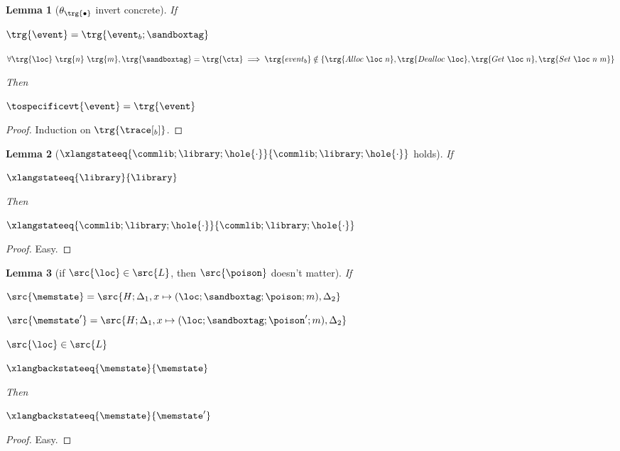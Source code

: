 \documentclass[a4paper,names,dvipsnames]{article}
\newtheorem{lemma}{Lemma}
\begin{document}
\begin{lemma}[$\theta_{\trg{\bullet}}$ invert concrete]\label{lem:trgfilter:invert:concrete}
  If
  \begin{goals}
    \item $\trg{\event}=\trg{\event_{b};\sandboxtag}$
    \item $\forall\trg{\loc}\ \trg{n}\ \trg{m},\trg{\sandboxtag}=\trg{\ctx}\implies\trg{event_{b}}\notin\{\trg{Alloc\ \loc\ n},\trg{Dealloc\ \loc},\trg{Get\ \loc\ n},\trg{Set\ \loc\ n\ m}\}$
  \end{goals}
  Then
  \begin{assumptions}
    \item $\tospecificevt{\event}=\trg{\event}$
  \end{assumptions}
\end{lemma}
\begin{proof}
  Induction on $\trg{\trace[_{b}]}$.
\end{proof}

\begin{lemma}[$\xlangstateeq{\commlib;\library;\hole{\cdot}}{\commlib;\library;\hole{\cdot}}$ holds]\label{lem:cfeq:refl}
  If
  \begin{assumptions}
    \item $\xlangstateeq{\library}{\library}$
  \end{assumptions}
  Then
  \begin{goals}
    \item $\xlangstateeq{\commlib;\library;\hole{\cdot}}{\commlib;\library;\hole{\cdot}}$
  \end{goals}
\end{lemma}
\begin{proof}
  Easy.
\end{proof}

\begin{lemma}[if $\src{\loc}\in\src{L}$, then $\src{\poison}$ doesn't matter]\label{lem:locinL:poisondoesntmatter}
  If
  \begin{assumptions}
    \item $\src{\memstate}=\src{H;\Delta_{1},x\mapsto(\loc;\sandboxtag;\poison;m),\Delta_{2}}$
    \item $\src{\memstate'}=\src{H;\Delta_{1},x\mapsto(\loc;\sandboxtag;\poison';m),\Delta_{2}}$
    \item $\src{\loc}\in\src{L}$
    \item $\xlangbackstateeq{\memstate}{\memstate}$
  \end{assumptions}
  Then
  \begin{goals}
    \item $\xlangbackstateeq{\memstate}{\memstate'}$
  \end{goals}
\end{lemma}
\begin{proof}
  Easy.
\end{proof}
\end{document}
